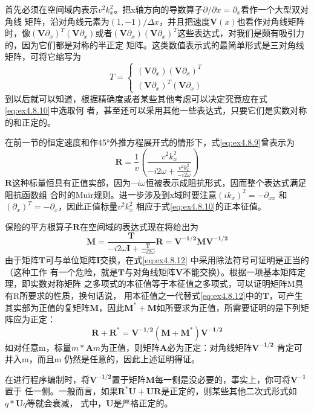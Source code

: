 首先必须在空间域内表示$v^2k_x^2$。把x轴方向的导数算子$\partial/\partial x=\partial_x$看作一个大型双对角线
矩阵，沿对角线元素为$(1,-1)/\Delta x$，并且把速度$\mathbf{V}(x)$也看作对角线矩阵时，像$(\mathbf{V}\partial _x)^T(\mathbf{V}\partial _x)$或者$(\mathbf{V}\partial _x)(\mathbf{V}\partial _x)^T$这些表达式，对我们是颇有吸引力的，因为它们都是对称的半正定
矩阵。这类数值表示式的最简单形式是三对角线矩阵，可将它缩写为
\begin{equation}\label{eq:ex4.8.10}
T=\begin{cases}
(\mathbf{V}\partial _x)(\mathbf{V}\partial _x)^T \\
(\mathbf{V}\partial _x)^T(\mathbf{V}\partial _x)
\end{cases}
\end{equation}
到以后就可以知道，根据精确度或者某些其他考虑可以决定究竟应在式\ref{eq:ex4.8.10}中选取何
者，甚至还可以采用其他一些表达式，只要它们是实数对称的和正定的。

在前一节的恒定速度和作45°外推方程展开式的情形下，式\ref{eq:ex4.8.9}曾表示为
\begin{equation}
\mathbf{R}=\frac{1}{v}(\frac{v^2k_x^2}{-i2\omega+\frac{v^2k_x^2}{-i2\omega}})
\label{eq:ex4.8.11}
\end{equation}
$\mathbf{R}$这种标量恒具有正值实部，因为$-i\omega$恒被表示成阻抗形式，因而整个表达式满足阻抗函数组
合时的Muir规则。进一步涉及到x域时要注意$(ik_x)^2=-\partial_{xx}$
和$(\partial_x)^T=-\partial_x$，因此正值标量$v^2k_x^2$
相应于式\ref{eq:ex4.8.10}的正本征值。

保险的平方根算子$\mathbf{R}$在空间域的表达式现在将给出为
\begin{subequations}
\begin{equation}
\mathbf{M}=\frac{\mathbf{T}}{-i2\omega\mathbf{I}+\frac{\mathbf{T}}{-i2\omega}}
\label{eq:ex4.8.12a}
\end{equation}
\begin{equation}
\mathbf{R}=\mathbf{V^{-1/2}MV^{-1/2}}
\label{eq:ex4.8.12b}
\end{equation}
\label{eq:ex4.8.12}
\end{subequations}
由于矩阵$\mathbf{T}$可与单位矩阵$\mathbf{I}$交换，在式\ref{eq:ex4.8.12}
中采用除法符号可证明是正当的（这种工作
有一个危险，就是$\mathbf{T}$与对角线矩阵$\mathbf{V}$不能交换）。根据一项基本矩阵定理，即实数对称矩阵
之多项式的本征值等于本征值之多项式，可以证明矩阵M具有R所要求的性质，换句话说，
用本征值之一代替式\ref{eq:ex4.8.12}中的$\mathbf{T}$，可产生其实部为正值的复矩阵$\mathbf{M}$，因此$
\mathbf{M^*+M}$如所要求为正值，所需要证明的是下列矩阵应为正定：
\begin{equation}
\mathbf{R+R^*}=\mathbf{V^{-1/2}(M+M^*)V^{-1/2}}
\label{eq:ex4.8.13}
\end{equation}
如对任意m，标量$m*\mathbf{A}m$为正值，则矩阵$\mathbf{A}$必为正定：对角线矩阵$\mathbf{V^{-1/2}}$
肯定可并入m，而且m
仍然是任意的，因此上述证明得证。

在进行程序编制时，将$\mathbf{V^{-1/2}}$置于矩阵$\mathbf{M}$每一侧是没必要的，事实上，你可将$\mathbf{V^{-1}}$置于
任一侧。一般而言，如果$\mathbf{R^*U+UR}$是正定的，则某些其他二次式形式如$q*\mathbf{U}q$等就会衰减， 式中，$\mathbf{U}$是严格正定的。

